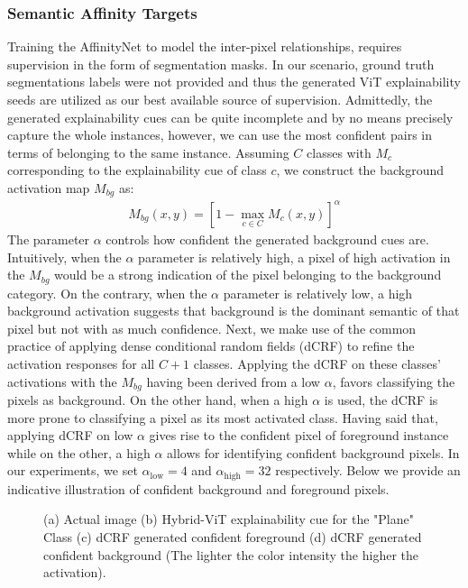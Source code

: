\subsubsection{Semantic Affinity Targets}
Training the AffinityNet to model the inter-pixel relationships, requires supervision in the form of segmentation masks. In our scenario, ground truth segmentations labels were not provided and thus the generated ViT explainability seeds are utilized as our best available source of supervision. Admittedly, the generated explainability cues can be quite incomplete and by no means precisely capture the whole instances, however, we can use the most confident pairs in terms of belonging to the same instance. Assuming $C$ classes with $M_{c}$ corresponding to the explainability cue of class $c$, we construct the background activation map $M_{bg}$ as:
\begin{align*}
\label{eq:dropweight}
M_{bg}(x,y) = \left[1 - \max\limits_{c\in C} M_c(x,y)\right]^\alpha
\end{align*}
The parameter $\alpha$ controls how confident the generated background cues are. Intuitively, when the $\alpha$ parameter is relatively high, a pixel of high activation in the $M_{bg}$ would be a strong indication of the pixel belonging to the background category. On the contrary, when the $\alpha$ parameter is relatively low, a high background activation suggests that background is the dominant semantic of that pixel but not with as much confidence. Next, we make use of the common practice of applying dense conditional random fields (dCRF) \cite{krahenbuhl2011efficient} to refine the activation responses for all $C+1$ classes. Applying the dCRF on these classes' activations with the $M_{bg}$ having been derived from a low $\alpha$, favors classifying the pixels as background. On the other hand, when a high $\alpha$ is used, the dCRF is more prone to classifying a pixel as its most activated class. Having said that, applying dCRF on low $\alpha$ gives rise to the confident pixel of foreground instance while on the other, a high $\alpha$ allows for identifying confident background pixels. In our experiments, we set $\alpha_\text{low} = 4$ and $\alpha_\text{high} = 32$ respectively. Below we provide an indicative illustration of confident background and foreground pixels. 

\begin{figure}[H]
    \centering
    \caption{(a) Actual image (b) Hybrid-ViT explainability cue for the "Plane" Class (c) dCRF generated confident foreground (d) dCRF generated confident background (The lighter the color intensity the higher the activation).}
    \label{fig:fig1}
\end{figure}

